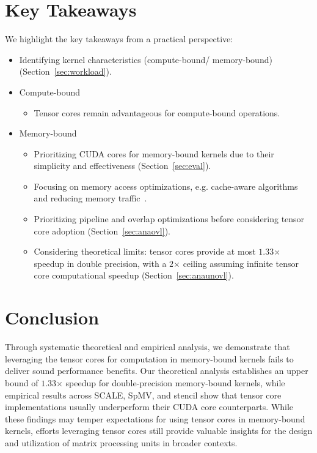 \section{Key Takeaways}\label{sec:tackaway}
We highlight the key takeaways from a practical perspective: %

\begin{itemize}
    \item Identifying kernel characteristics (compute-bound/ memory-bound) (Section~\ref{sec:workload}). 
    \item Compute-bound
    \begin{itemize}
        \item Tensor cores remain advantageous for compute-bound operations.
    \end{itemize}
    \item Memory-bound
        \begin{itemize}
        \item Prioritizing CUDA cores for memory-bound kernels due to their simplicity and effectiveness (Section~\ref{sec:eval}).
        \item Focusing on memory access optimizations, e.g. cache-aware algorithms and reducing memory traffic~\cite{10.1145/3577193.3593716,10.1145/3577193.3593705}.
        \item Prioritizing pipeline and overlap optimizations before considering tensor core adoption (Section~\ref{sec:anaovl}). 
        \item Considering theoretical limits: tensor cores provide at most $1.33$× speedup in double precision, with a $2$× ceiling assuming infinite tensor core computational speedup (Section~\ref{sec:anaunovl}).
    \end{itemize}
\end{itemize}

\section{Conclusion}\label{sec:conclude}

Through systematic theoretical and empirical analysis, we demonstrate that leveraging the tensor cores for computation in memory-bound kernels fails to deliver sound performance benefits. 
Our theoretical analysis establishes an upper bound of $1.33$× speedup for double-precision memory-bound kernels, while empirical results across SCALE, SpMV, and stencil show that tensor core implementations usually underperform their CUDA core counterparts. 
While these findings may temper expectations for using tensor cores in memory-bound kernels, efforts leveraging tensor cores still provide valuable insights for the design and utilization of matrix processing units in broader contexts.

